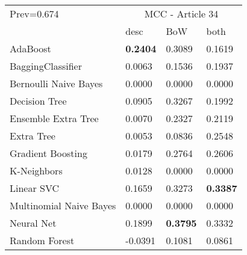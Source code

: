 \begin{tabular}{|l|l|l|l| }
\hline
Prev=0.674 &  \multicolumn{3}{c|}{MCC - Article 34} \\
\cline{2-4} & desc & BoW & both \\ \hline
AdaBoost                & {\bf 0.2404} & 0.3089 & 0.1619\\
BaggingClassifier       & 0.0063 & 0.1536 & 0.1937\\
Bernoulli Naive Bayes   & 0.0000 & 0.0000 & 0.0000\\
Decision Tree           & 0.0905 & 0.3267 & 0.1992\\
Ensemble Extra Tree     & 0.0070 & 0.2327 & 0.2119\\
Extra Tree              & 0.0053 & 0.0836 & 0.2548\\
Gradient Boosting       & 0.0179 & 0.2764 & 0.2606\\
K-Neighbors             & 0.0128 & 0.0000 & 0.0000\\
Linear SVC              & 0.1659 & 0.3273 & {\bf 0.3387}\\
Multinomial Naive Bayes & 0.0000 & 0.0000 & 0.0000\\
Neural Net              & 0.1899 & {\bf 0.3795} & 0.3332\\
Random Forest           & -0.0391 & 0.1081 & 0.0861\\
\hline
\end{tabular}
